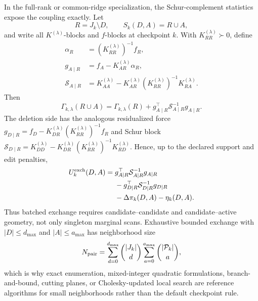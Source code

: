\documentclass[
  reprint,
  amsmath,
  amssymb,
  aps,
  pra,
  nofootinbib,
  superscriptaddress,
  floatfix
]{revtex4-2}
\begin{document}
In the full-rank or common-ridge specialization, the Schur-complement
statistics expose the coupling exactly.  Let
\[
R=J_k\setminus D,
\qquad
S_k(D,A)=R\cup A,
\]
and write all \(K^{(\lambda)}\)-blocks and \(f\)-blocks at checkpoint \(k\).
With \(K_{RR}^{(\lambda)}\succ0\), define
\begin{equation}
\begin{aligned}
\alpha_R&=\left(K_{RR}^{(\lambda)}\right)^{-1}f_R,\\
g_{A\mid R}&=f_A-K_{AR}^{(\lambda)}\alpha_R,\\
\mathcal S_{A\mid R}
&=K_{AA}^{(\lambda)}
-K_{AR}^{(\lambda)}
\left(K_{RR}^{(\lambda)}\right)^{-1}
K_{RA}^{(\lambda)}.
\end{aligned}
\label{eq:exchange_schur_append_stats}
\end{equation}
Then
\begin{equation}
\Gamma_{k,\lambda}(R\cup A)
=
\Gamma_{k,\lambda}(R)
+g_{A\mid R}^{\top}
\mathcal S_{A\mid R}^{-1}
g_{A\mid R}.
\label{eq:exchange_schur_append_value}
\end{equation}
The deletion side has the analogous residualized force
\(g_{D\mid R}=f_D-K_{DR}^{(\lambda)}
(K_{RR}^{(\lambda)})^{-1}f_R\) and Schur block
\(\mathcal S_{D\mid R}=K_{DD}^{(\lambda)}
-K_{DR}^{(\lambda)}(K_{RR}^{(\lambda)})^{-1}K_{RD}^{(\lambda)}\).
Hence, up to the declared support and edit penalties,
\begin{equation}
\begin{aligned}
U_k^{\rm exch}(D,A)
={}&
g_{A\mid R}^{\top}\mathcal S_{A\mid R}^{-1}g_{A\mid R}
\\
&-
g_{D\mid R}^{\top}\mathcal S_{D\mid R}^{-1}g_{D\mid R}\\
&-\Delta\pi_k(D,A)-\eta_k(D,A).
\end{aligned}
\label{eq:exchange_schur_coupled_value}
\end{equation}
Thus batched exchange requires candidate--candidate and candidate--active
geometry, not only singleton marginal scans.  Exhaustive bounded exchange with
\(|D|\le d_{\max}\) and \(|A|\le a_{\max}\) has neighborhood size
\begin{equation}
N_{\rm pair}
=
\sum_{d=0}^{d_{\max}}\binom{|J_k|}{d}
\sum_{a=0}^{a_{\max}}\binom{|\mathcal P_k|}{a},
\label{eq:exchange_neighborhood_size}
\end{equation}
which is why exact enumeration, mixed-integer quadratic formulations,
branch-and-bound, cutting planes, or Cholesky-updated local search are reference
algorithms for small neighborhoods rather than the default checkpoint rule.
\end{document}
